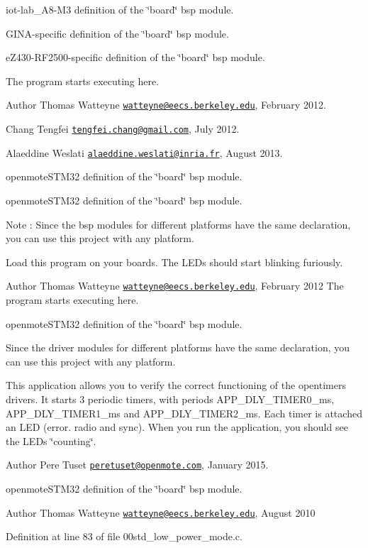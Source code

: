 iot-\/lab\+\_\+\+A8-\/\+M3 definition of the \char`\"{}board\char`\"{} bsp module.

G\+I\+N\+A-\/specific definition of the \char`\"{}board\char`\"{} bsp module.

e\+Z430-\/\+R\+F2500-\/specific definition of the \char`\"{}board\char`\"{} bsp module.

The program starts executing here.

\begin{DoxyAuthor}{Author}
Thomas Watteyne \href{mailto:watteyne@eecs.berkeley.edu}{\tt watteyne@eecs.\+berkeley.\+edu}, February 2012. 

Chang Tengfei \href{mailto:tengfei.chang@gmail.com}{\tt tengfei.\+chang@gmail.\+com}, July 2012. 

Alaeddine Weslati \href{mailto:alaeddine.weslati@inria.fr}{\tt alaeddine.\+weslati@inria.\+fr}, August 2013.
\end{DoxyAuthor}
openmote\+S\+T\+M32 definition of the \char`\"{}board\char`\"{} bsp module.

openmote\+S\+T\+M32 definition of the \char`\"{}board\char`\"{} bsp module.

\begin{DoxyNote}{Note}
\+: Since the bsp modules for different platforms have the same declaration, you can use this project with any platform.
\end{DoxyNote}
Load this program on your boards. The L\+E\+Ds should start blinking furiously.

\begin{DoxyAuthor}{Author}
Thomas Watteyne \href{mailto:watteyne@eecs.berkeley.edu}{\tt watteyne@eecs.\+berkeley.\+edu}, February 2012 The program starts executing here.
\end{DoxyAuthor}
openmote\+S\+T\+M32 definition of the \char`\"{}board\char`\"{} bsp module.

Since the driver modules for different platforms have the same declaration, you can use this project with any platform.

This application allows you to verify the correct functioning of the opentimers drivers. It starts 3 periodic timers, with periods A\+P\+P\+\_\+\+D\+L\+Y\+\_\+\+T\+I\+M\+E\+R0\+\_\+ms, A\+P\+P\+\_\+\+D\+L\+Y\+\_\+\+T\+I\+M\+E\+R1\+\_\+ms and A\+P\+P\+\_\+\+D\+L\+Y\+\_\+\+T\+I\+M\+E\+R2\+\_\+ms. Each timer is attached an L\+ED (error. radio and sync). When you run the application, you should see the L\+E\+Ds \char`\"{}counting\char`\"{}.

\begin{DoxyAuthor}{Author}
Pere Tuset \href{mailto:peretuset@openmote.com}{\tt peretuset@openmote.\+com}, January 2015.
\end{DoxyAuthor}
openmote\+S\+T\+M32 definition of the \char`\"{}board\char`\"{} bsp module.

\begin{DoxyAuthor}{Author}
Thomas Watteyne \href{mailto:watteyne@eecs.berkeley.edu}{\tt watteyne@eecs.\+berkeley.\+edu}, August 2010 
\end{DoxyAuthor}


Definition at line 83 of file 00std\+\_\+low\+\_\+power\+\_\+mode.\+c.

